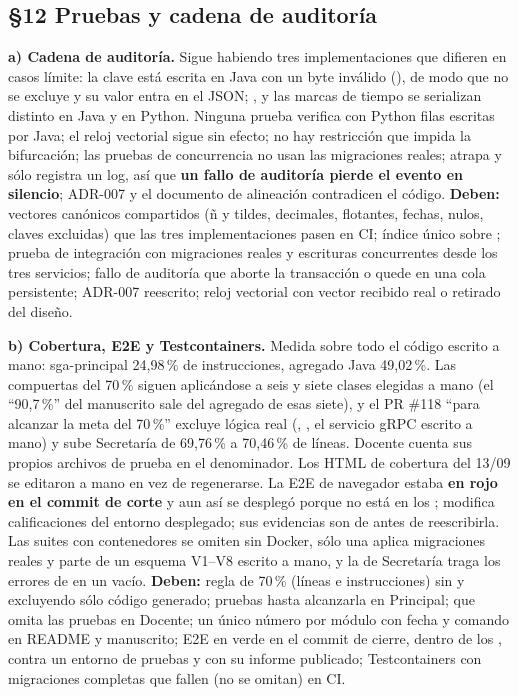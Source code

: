 \subsection*{\S12 Pruebas y cadena de auditor\'ia}
\textbf{a) Cadena de auditor\'ia.} Sigue habiendo tres implementaciones que difieren en casos l\'imite: la clave  est\'a escrita en Java con un byte inv\'alido (), de modo que no se excluye y su valor entra en el JSON; ,  y las marcas de tiempo se serializan distinto en Java y en Python. Ninguna prueba verifica con Python filas escritas por Java; el reloj vectorial sigue sin efecto; no hay restricci\'on  que impida la bifurcaci\'on; las pruebas de concurrencia no usan las migraciones reales;  atrapa  y s\'olo registra un log, as\'i que \textbf{un fallo de auditor\'ia pierde el evento en silencio}; ADR-007 y el documento de alineaci\'on contradicen el c\'odigo. \textbf{Deben:} vectores can\'onicos compartidos (\~n y tildes, decimales, flotantes, fechas, nulos, claves excluidas) que las tres implementaciones pasen en CI; \'indice \'unico sobre ; prueba de integraci\'on con migraciones reales y escrituras concurrentes desde los tres servicios; fallo de auditor\'ia que aborte la transacci\'on o quede en una cola persistente; ADR-007 reescrito; reloj vectorial con vector recibido real o retirado del dise\~no.

\textbf{b) Cobertura, E2E y Testcontainers.} Medida sobre todo el c\'odigo escrito a mano: sga-principal 24,98\,\% de instrucciones, agregado Java 49,02\,\%. Las compuertas del 70\,\% siguen aplic\'andose a seis y siete clases elegidas a mano (el ``90,7\,\%'' del manuscrito sale del agregado de esas siete), y el PR \#118 ``para alcanzar la meta del 70\,\%'' excluye l\'ogica real (, , el servicio gRPC escrito a mano) y sube Secretar\'ia de 69,76\,\% a 70,46\,\% de l\'ineas. Docente cuenta sus propios archivos de prueba en el denominador. Los HTML de cobertura del 13/09 se editaron a mano en vez de regenerarse. La E2E de navegador estaba \textbf{en rojo en el commit de corte} y aun as\'i se despleg\'o porque no est\'a en los ; modifica calificaciones del entorno desplegado; sus evidencias son de antes de reescribirla. Las suites con contenedores se omiten sin Docker, s\'olo una aplica migraciones reales y parte de un esquema V1--V8 escrito a mano, y la de Secretar\'ia traga los errores de  en un  vac\'io. \textbf{Deben:} regla  de 70\,\% (l\'ineas e instrucciones) sin  y excluyendo s\'olo c\'odigo generado; pruebas hasta alcanzarla en Principal;  que omita las pruebas en Docente; un \'unico n\'umero por m\'odulo con fecha y comando en README y manuscrito; E2E en verde en el commit de cierre, dentro de los , contra un entorno de pruebas y con su informe publicado; Testcontainers con migraciones completas que fallen (no se omitan) en CI.

